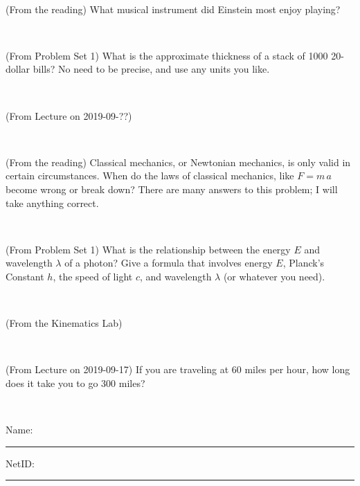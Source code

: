 \documentclass[12pt, letterpaper]{article}
\begin{document}
\vfill ~

\begin{problem} (From the reading)
What musical instrument did Einstein most enjoy playing?
\end{problem}


\vfill ~

\begin{problem} (From Problem Set 1)
What is the approximate thickness of a stack of 1000 20-dollar bills?
No need to be precise, and use any units you like.
\end{problem}


\vfill ~

\begin{problem} (From Lecture on 2019-09-??)
\end{problem}


\vfill ~


\clearpage


\begin{problem} (From the reading)
Classical mechanics, or Newtonian mechanics, is only valid in certain
circumstances. When do the laws of classical mechanics, like $F =
m\,a$ become wrong or break down? There are many answers to this
problem; I will take anything correct.
\end{problem}


\vfill ~

\begin{problem} (From Problem Set 1)
What is the relationship between the energy $E$ and wavelength
$\lambda$ of a photon? Give a formula that involves energy $E$,
Planck's Constant $h$, the speed of light $c$, and wavelength
$\lambda$ (or whatever you need).
\end{problem}

\vfill ~

\begin{problem} (From the Kinematics Lab)

\end{problem}


\vfill ~

\begin{problem} (From Lecture on 2019-09-17)
If you are traveling at 60 miles per hour, how long does
it take you to go 300 miles?
\end{problem}


\vfill ~


\cleardoublepage



\noindent
Name: \rule[-1ex]{0.60\textwidth}{0.1pt}
NetID: \rule[-1ex]{0.20\textwidth}{0.1pt}
\end{document}
